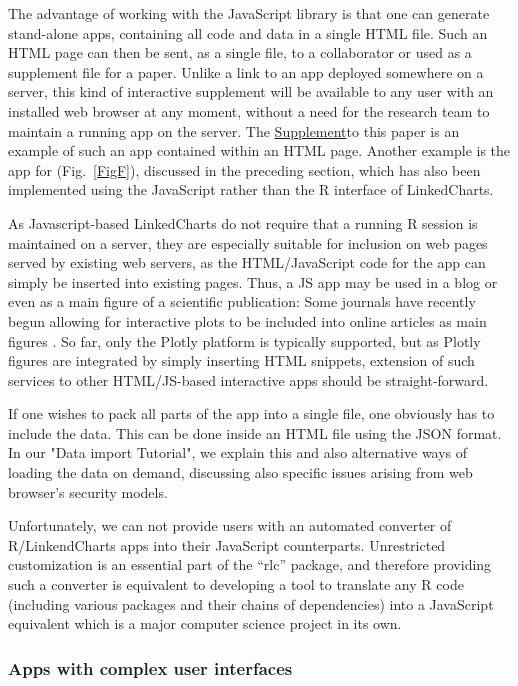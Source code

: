 \documentclass[twocolumn,10pt]{article}
\newcommand{\Supplement}{\href{https://anders-biostat.github.io/lc-paper/}{Supplement}}
\begin{document}
The advantage of working with the JavaScript library is that one can generate stand-alone apps, containing all code and data in a single HTML file. Such an HTML page can then be sent, as a single file, to a collaborator or used as a supplement file for a paper. Unlike a link to an app deployed somewhere on a server, this kind of interactive supplement will be available to any user with an installed web browser at any moment, without a need for the research team to maintain a running app on the server. The \Supplement to this paper is an example of such an app contained within an HTML page. Another example is the app for \citet{wang_2020} (Fig.\ \ref{FigF}), discussed in the preceding section, which has also been implemented using the JavaScript rather than the R interface of LinkedCharts. 

As Javascript-based LinkedCharts do not require that a running R session is maintained on a server, they are especially suitable for inclusion on web pages served by existing web servers, as the HTML/JavaScript code for the app can simply be inserted into existing pages. Thus, a JS app may be used in a blog or even as a main figure of a scientific publication: Some journals have recently begun allowing for interactive plots to be included into online articles as main figures \citep{ingraham_2017}. So far, only the Plotly platform is typically supported, but as Plotly figures are integrated by simply inserting HTML snippets, extension of such services to other HTML/JS-based interactive apps should be straight-forward.

If one wishes to pack all parts of the app into a single file, one obviously has to include the data. This can be done inside an HTML file using the JSON format. In our "Data import Tutorial", we explain this and also alternative ways of loading the data on demand, discussing also specific issues arising from web browser's security models.

Unfortunately, we can not provide users with an automated converter of R/LinkendCharts apps into their JavaScript counterparts. Unrestricted customization is an essential part of the ``rlc'' package, and therefore providing such a converter is equivalent to developing a tool to translate any R code (including various packages and their chains of dependencies) into a JavaScript equivalent which is a major computer science project in its own.

\subsubsection{Apps with complex user interfaces}\label{gui_apps}
\end{document}
